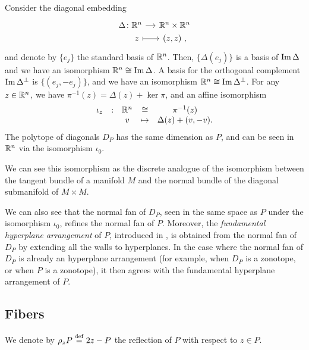 Consider the diagonal embedding
\[
\begin{tikzcd}[row sep=0, column sep=small]
	\Delta \colon \R^n \arrow{r} & \R^n \times \R^n \\
	\phantom{\Delta \colon} z \arrow[r, |->] & (z,z) \ ,
\end{tikzcd}
\]
and denote by $\{e_j\}$ the standard basis of $\mathbb{R}^n$.
Then, $\{\Delta (e_j)\}$ is a basis of $\operatorname{\mathrm{Im}} \Delta$ and we have an isomorphism $\mathbb{R}^n \cong \operatorname{\mathrm{Im}} \Delta$.
A basis for the orthogonal complement $\operatorname{\mathrm{Im}} \Delta^{\bot}$ is $\{(e_j,-e_j)\}$, and we have an isomorphism $\mathbb{R}^n \cong \operatorname{\mathrm{Im}} \Delta^{\bot}$.
For any $z \in \mathbb{R}^n$, we have $\pi^{-1}(z)=\Delta(z)+\ker \pi$, and an affine isomorphism
\begin{equation} \label{eq:D_P-iso}
	\begin{matrix}
		\iota_z & : & \mathbb{R}^n  & \cong & \pi^{-1}(z) \\
		& & v  & \mapsto & \Delta(z)+(v,-v).
	\end{matrix}
\end{equation}
The polytope of diagonals $D_P$ has the same dimension as $P$, and can be seen in $\mathbb{R}^n$ via the isomorphism $\iota_0$.

\begin{remark}
	We can see this isomorphism as the discrete analogue of the isomorphism between the tangent bundle of a manifold $M$ and the normal bundle of the diagonal submanifold of $M\times M$.
\end{remark}

We can also see that the normal fan of $D_P$, seen in the same space as $P$ under the isomorphism $\iota_0$, refines the normal fan of $P$.
Moreover, the \emph{fundamental hyperplane arrangement} of $P$, introduced in \cite[Definition 1.18]{GLA21}, is obtained from the normal fan of $D_P$ by extending all the walls to hyperplanes.
In the case where the normal fan of $D_P$ is already an hyperplane arrangement (for example, when $D_P$ is a zonotope, or when $P$ is a zonotope), it then agrees with the fundamental hyperplane arrangement of $P$.

\subsection{Fibers}


We denote by $\rho_z P \stackrel{\mathrm{def}}{=} 2z-P$ the reflection of $P$ with respect to $z \in P$.

